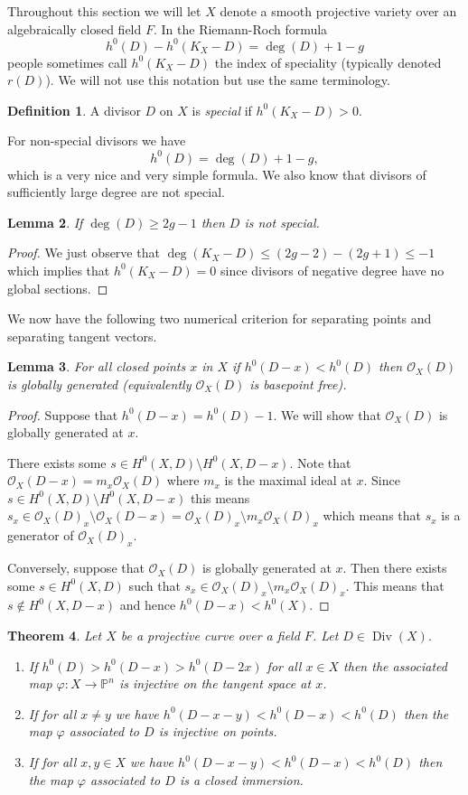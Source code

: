 \documentclass[12pt]{article}
\numberwithin{equation}{section}
\newtheorem{theorem}{Theorem}[subsection]
\newtheorem{lemma}[theorem]{Lemma}
\theoremstyle{definition}
\newtheorem{definition}[theorem]{Definition}
\theoremstyle{remark}
\newcommand{\Ocal}{\mathcal{O}}
\newcommand{\PP}{\mathbb{P}}
\newcommand{\Div}{\operatorname{Div}}
\begin{document}
Throughout this section we will let $X$ denote a smooth projective variety over an algebraically closed field $F$.
In the Riemann-Roch formula
 $$ h^0(D) - h^0(K_X-D) =\deg(D) + 1-g $$
people sometimes call $h^0(K_X-D)$ the index of speciality (typically denoted $r(D)$).
We will not use this notation but use the same terminology.
\begin{definition}
	A divisor $D$ on $X$ is \emph{special} if $h^0(K_X-D)>0$. 
\end{definition}
For non-special divisors we have 
 $$ h^0(D) = \deg(D) + 1-g,$$
which is a very nice and very simple formula. 
We also know that divisors of sufficiently large degree are not special.
\begin{lemma}
	If $\deg(D)\geq 2g-1$ then $D$ is not special.
\end{lemma}
\begin{proof}
	We just observe that $\deg(K_X-D)\leq (2g-2)-(2g+1)\leq -1$ which implies that $h^0(K_X-D)=0$ since divisors of negative degree have no global sections.
\end{proof}
We now have the following two numerical criterion for separating points and separating tangent vectors. 
\begin{lemma}\label{lem:need}
For all closed points $x$ in $X$ if $h^0(D-x)<h^0(D)$ then $\Ocal_X(D)$ is globally generated (equivalently $\Ocal_X(D)$ is basepoint free).
\end{lemma}
\begin{proof}
Suppose that $h^0(D-x) = h^0(D)-1$. 
	We will show that $\Ocal_X(D)$ is globally generated at $x$.
	
	There exists some $s \in H^0(X,D)\setminus H^0(X,D-x)$.  
	Note that $\Ocal_X(D-x) = m_x\Ocal_X(D)$ where $m_x$ is the maximal ideal at $x$. 
	Since $s\in H^0(X,D)\setminus H^0(X,D-x)$ this means $s_x \in \Ocal_X(D)_x\setminus \Ocal_X(D-x) = \Ocal_X(D)_x \setminus m_x \Ocal_X(D)_x$ which means that $s_x$ is a generator of $\Ocal_X(D)_x$.
	
	Conversely, suppose that $\Ocal_X(D)$ is globally generated at $x$. 
	Then there exists some $s\in H^0(X,D)$ such that $s_x \in \Ocal_X(D)_x\setminus m_x\Ocal_X(D)_x$.
	This means that $s\notin H^0(X,D-x)$ and hence $h^0(D-x)<h^0(X)$.
\end{proof}

\begin{theorem}
	Let $X$ be a projective curve over a field $F$. 
	Let $D\in \Div(X)$.
	\begin{enumerate}
		\item 	If $h^0(D)>h^0(D-x)>h^0(D-2x)$ for all $x\in X$ then the associated map $\varphi:X \to \PP^n$ is injective on the tangent space at $x$.
		\item If for all $x\neq y$ we have $h^0(D-x-y)<h^0(D-x)<h^0(D)$ then the map $\varphi$ associated to $D$ is injective on points.
		\item If for all $x,y\in X$ we have $h^0(D-x-y)<h^0(D-x)<h^0(D)$ then the map $\varphi$ associated to $D$ is a closed immersion.
	\end{enumerate}
\end{theorem}
\end{document}
